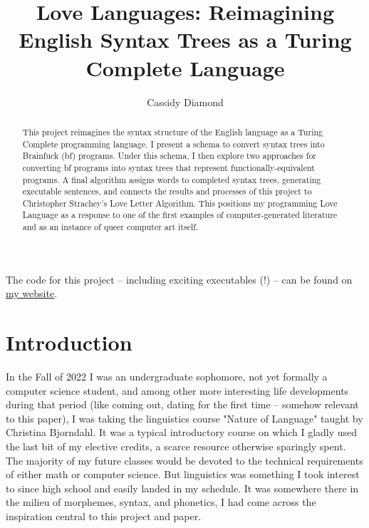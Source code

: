 \documentclass[runningheads]{llncs}
\begin{document}

\title{Love Languages: Reimagining English Syntax Trees as a Turing Complete Language}

\author{
	Cassidy Diamond
}



\maketitle

\begin{abstract}
	This project reimagines the syntax structure of the English language as a Turing Complete programming language. I present a schema to convert syntax trees into Brainfuck (bf) programs. Under this schema, I then explore two approaches for converting bf programs into syntax trees that represent functionally-equivalent programs. A final algorithm assigns words to completed syntax trees, generating executable sentences, and connects the results and processes of this project to Christopher Strachey's Love Letter Algorithm. This positions my programming Love Language as a response to one of the first examples of computer-generated literature and as an instance of queer computer art itself.
\end{abstract}

The code for this project -- including exciting executables (!) -- can be found on \href{https://example.com}{my website}. %
\section{Introduction}
In the Fall of 2022 I was an undergraduate sophomore, not yet formally a computer science student, and among other more interesting life developments during that period (like coming out, dating for the first time -- somehow relevant to this paper), I was taking the linguistics course "Nature of Language" taught by Christina Bjorndahl. It was a typical introductory course on which I gladly used the last bit of my elective credits, a scarce resource otherwise sparingly spent. The majority of my future classes would be devoted to the technical requirements of either math or computer science. But linguistics was something I took interest to since high school and easily landed in my schedule. It was somewhere there in the milieu of morphemes, syntax, and phonetics, I had come across the inspiration central to this project and paper.
\end{document}
